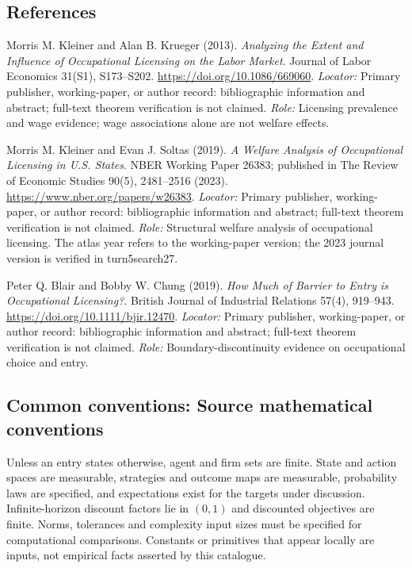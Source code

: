 \documentclass[11pt,a4paper]{article}
\begin{document}
\subsection*{References}
\begin{enumerate}[label=\textnormal{[S\arabic*]},leftmargin=*]
\item Morris M. Kleiner and Alan B. Krueger (2013). \emph{Analyzing the Extent and Influence of Occupational Licensing on the Labor Market}. Journal of Labor Economics 31(S1), S173--S202. \url{https://doi.org/10.1086/669060}. \textit{Locator:} Primary publisher, working-paper, or author record: bibliographic information and abstract; full-text theorem verification is not claimed. \textit{Role:} Licensing prevalence and wage evidence; wage associations alone are not welfare effects.
\item Morris M. Kleiner and Evan J. Soltas (2019). \emph{A Welfare Analysis of Occupational Licensing in U.S. States}. NBER Working Paper 26383; published in The Review of Economic Studies 90(5), 2481--2516 (2023). \url{https://www.nber.org/papers/w26383}. \textit{Locator:} Primary publisher, working-paper, or author record: bibliographic information and abstract; full-text theorem verification is not claimed. \textit{Role:} Structural welfare analysis of occupational licensing. The atlas year refers to the working-paper version; the 2023 journal version is verified in turn5search27.
\item Peter Q. Blair and Bobby W. Chung (2019). \emph{How Much of Barrier to Entry is Occupational Licensing?}. British Journal of Industrial Relations 57(4), 919--943. \url{https://doi.org/10.1111/bjir.12470}. \textit{Locator:} Primary publisher, working-paper, or author record: bibliographic information and abstract; full-text theorem verification is not claimed. \textit{Role:} Boundary-discontinuity evidence on occupational choice and entry.
\end{enumerate}

\subsection*{Common conventions: Source mathematical conventions}

Unless an entry states otherwise, agent and firm sets are finite. State and action spaces are measurable, strategies and outcome maps are measurable, probability laws are specified, and expectations exist for the targets under discussion. Infinite-horizon discount factors lie in $(0,1)$ and discounted objectives are finite. Norms, tolerances and complexity input sizes must be specified for computational comparisons. Constants or primitives that appear locally are inputs, not empirical facts asserted by this catalogue.
\end{document}
